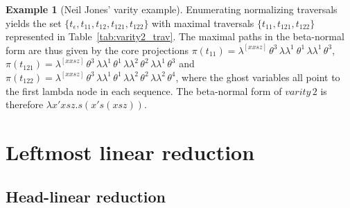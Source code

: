 \documentclass{elsarticle}
\theoremstyle{plain}
\theoremstyle{definition}
\newtheorem{example}{Example}[section]
\newcommand{\ghostlmd}{{\lambda\!\!\lambda}}
\newcommand{\ghostvar}{\theta}
\def\coresymbol{\pi} %
\newcommand{\core}[1]{\coresymbol(#1)} %
\begin{document}
\begin{example}[Neil Jones' varity example]
Enumerating normalizing traversals yields the set $\{t_\epsilon, t_{11}, t_{12}, t_{121}, t_{122} \}$ with maximal traversals $\{ t_{11}, t_{121}, t_{122} \}$ represented in Table~\ref{tab:varity2_trav}.
The maximal paths in the beta-normal form are thus given by the core projections
$\core{t_{11}} =
        \lambda^{[x x s z]} \,\ghostvar^{3}\,\ghostlmd^{1}\
        \ghostvar^{1}\,\ghostlmd^{1}\,\ghostvar^{3}
$,
$\core{t_{121}} =
        \lambda^{[x x s z]} \,\ghostvar^{3}\,\ghostlmd^{1}\,\ghostvar^{1}\,\ghostlmd^{2}\,\ghostvar^{2}\,\ghostlmd^{1}\,\ghostvar^{3}$
and
$\core{t_{122}} =
    \lambda^{[x x s z]} \,\ghostvar^{3}\,\ghostlmd^{1}\,\ghostvar^{1}\,\ghostlmd^{2}\,\ghostvar^{2}\,\ghostlmd^{2}\,\ghostvar^{4}$,
where the ghost variables all point to the first lambda node in each sequence.
The beta-normal form of $varity\, 2$ is therefore $\lambda x' x s z . s (x' s (x s z))$.
\end{example}


\section{Leftmost linear reduction}
\label{sec:leftmostlinearred}


\subsection{Head-linear reduction}
\end{document}
